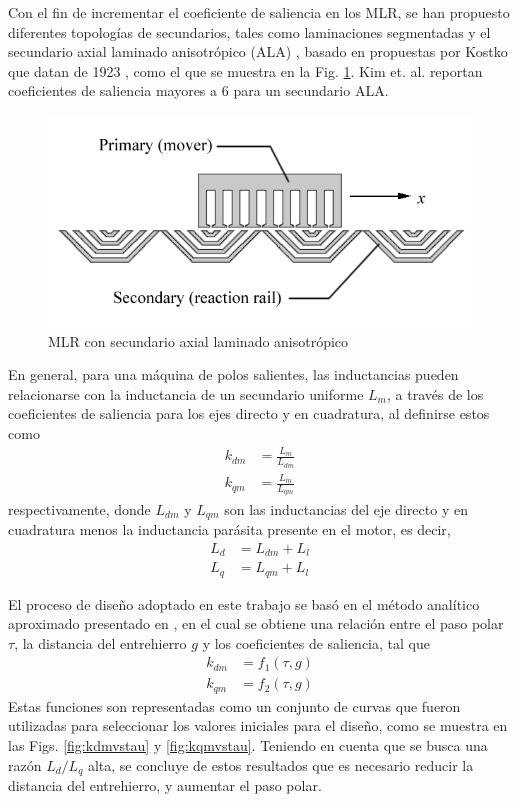 Con el fin de incrementar el coeficiente de saliencia en los MLR, se han propuesto diferentes topologías de secundarios, tales como laminaciones segmentadas \cite{lawrenson1967} y el secundario axial laminado anisotrópico (ALA) \cite{cruickshank1966,hamler1998}, basado en propuestas por Kostko que datan de 1923 \cite{kostko1923}, como el que se muestra en la Fig. \ref{fig:LVRM}. Kim et. al. reportan coeficientes de saliencia mayores a 6 \cite{leekimlee2014} para un secundario ALA.

\begin{figure}[t]
\centering
\includegraphics[scale=0.5]{../img/Teoria_del_MLR/LVRM.png}
\caption{MLR con secundario axial laminado anisotrópico}
\label{fig:LVRM}
\end{figure}

En general, para una máquina de polos salientes, las inductancias pueden relacionarse con la inductancia de un secundario uniforme $L_m$, a través de los coeficientes de saliencia para los ejes directo y en cuadratura, al definirse estos como
\begin{align}
k_{dm} &= \frac{L_m}{L_{dm}} \\
k_{qm} &= \frac{L_m}{L_{qm}}
\end{align}
respectivamente, donde $L_{dm}$ y $L_{qm}$ son las inductancias del eje directo y en cuadratura menos la inductancia parásita presente en el motor, es decir,
\begin{align}
L_d &= L_{dm} + L_l \\
L_q &= L_{qm} + L_l
\end{align}

El proceso de diseño adoptado en este trabajo se basó en el método analítico aproximado presentado en \cite{boldea1994}, en el cual se obtiene una relación entre el paso polar $\tau$, la distancia del entrehierro $g$ y los coeficientes de saliencia, tal que
\begin{align}
k_{dm} &= f_1(\tau,g) \\
k_{qm} &= f_2(\tau,g)
\end{align}
Estas funciones son representadas como un conjunto de curvas que fueron utilizadas para seleccionar los valores iniciales para el diseño, como se muestra en las Figs. \ref{fig:kdmvstau} y \ref{fig:kqmvstau}. Teniendo en cuenta que se busca una razón $L_d/L_q$ alta, se concluye de estos resultados que es necesario reducir la distancia del entrehierro, y aumentar el paso polar.

